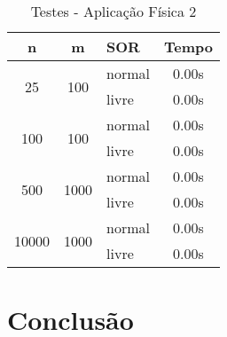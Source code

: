 \documentclass[
	11pt,				%
	oneside,			%
	a4paper,			%
	english,			%
	brazil,				%
	]{article}
\begin{document}
\begin{table}[ht]
\centering
\begin{tabular}{|c|c|l|c|}
\hline 
\textbf{n} & \textbf{m} & \textbf{SOR} & \textbf{Tempo} \\
\hline
\multirow{2}{*}{25}    & \multirow{2}{*}{100}  & normal & 0.00s \\
                       &                       & livre  & 0.00s \\
\hline
\multirow{2}{*}{100}   & \multirow{2}{*}{100}  & normal & 0.00s \\
                       &                       & livre  & 0.00s \\
\hline
\multirow{2}{*}{500}   & \multirow{2}{*}{1000} & normal & 0.00s \\
                       &                       & livre  & 0.00s \\
\hline
\multirow{2}{*}{10000} & \multirow{2}{*}{1000} & normal & 0.00s \\
                       &                       & livre  & 0.00s \\
\hline
\end{tabular}
\caption{Testes - Aplicação Física 2}
\label{tab:taf2}
\end{table}

\section{Conclusão}
\lipsum[5]

%
\end{document}
